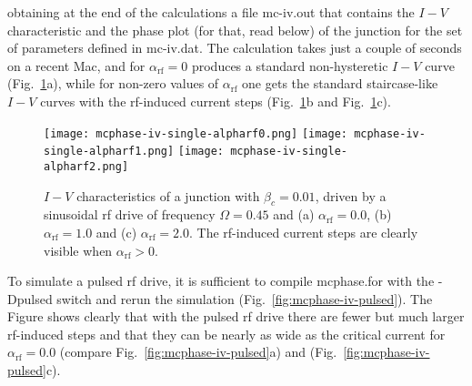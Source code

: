 obtaining at the end of the calculations a file \textsf{mc-iv.out} that contains the $I - V$ characteristic and the phase plot (for that, read below) of the junction for the set of parameters defined in \textsf{mc-iv.dat}. The calculation takes just a couple of seconds on a recent Mac, and for $\alpha_\mathrm{rf} = 0$ produces a standard non-hysteretic $I - V$ curve (Fig.~\ref{fig:mcphase-iv-single}a), while for non-zero values of $\alpha_\mathrm{rf}$ one gets the standard staircase-like $I - V$ curves with the rf-induced current steps (Fig.~\ref{fig:mcphase-iv-single}b and Fig.~\ref{fig:mcphase-iv-single}c).

\begin{figure}[h]
{
	\fboxsep=0pt
	\mbox{\texttt{[image: mcphase-iv-single-alpharf0.png]}}
	\hfill
	\mbox{\texttt{[image: mcphase-iv-single-alpharf1.png]}}
	\hfill
	\mbox{\texttt{[image: mcphase-iv-single-alpharf2.png]}}
}
	\caption{$I - V$ characteristics of a junction with $\beta_c = 0.01$, driven by a sinusoidal rf drive of frequency $\Omega = 0.45$ and (a) $\alpha_\mathrm{rf} = 0.0$, (b) $\alpha_\mathrm{rf} = 1.0$ and (c) $\alpha_\mathrm{rf} = 2.0$. The rf-induced current steps are clearly visible when $\alpha_\mathrm{rf} > 0$.}
	\label{fig:mcphase-iv-single}
\end{figure}


To simulate a pulsed rf drive, it is sufficient to compile \textsf{mcphase.for} with the \textsf{-Dpulsed} switch and rerun the simulation (Fig.~\ref{fig:mcphase-iv-pulsed}). The Figure shows clearly that with the pulsed rf drive there are fewer but much larger rf-induced steps and that they can be nearly as wide as the critical current for $\alpha_\mathrm{rf} = 0.0$ (compare Fig.~\ref{fig:mcphase-iv-pulsed}a) and (Fig.~\ref{fig:mcphase-iv-pulsed}c).


